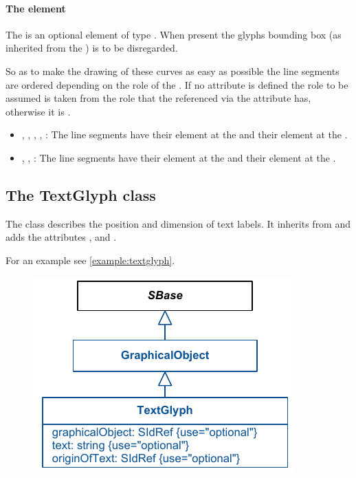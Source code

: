 \paragraph{The  element}
The  is an optional element of type \Curve. When present 
the glyphs bounding box (as inherited from the \GraphicalObject) is to 
be disregarded. 

So as to make the drawing of these curves as easy as possible the line 
segments are ordered depending on the role of the \ReferenceGlyph. If no 
 attribute is defined the role to be assumed is taken from 
the role that the \SpeciesReference referenced via the attribute 
 has, otherwise it is . 


\begin{itemize}
	\item {, , , 
	, : The line segments have their 
	 element at the \ReactionGlyph and their  
	element at the \SpeciesGlyph.} 
	\item {, 
	, : The line segments have their 
	 element at the \SpeciesGlyph and their  element 
	at the \ReactionGlyph.} 
\end{itemize}

\subsection{The TextGlyph class}
\label{textglyph-class}
The \TextGlyph class describes the position and dimension of text 
labels. It inherits from \GraphicalObject and adds the attributes 
,  and . 


For an example see \ref{example:textglyph}.

\begin{figure}[!h]
\includegraphics{uml/layout-textglyph-uml}\\
\label{uml:textglyph}
\end{figure}

